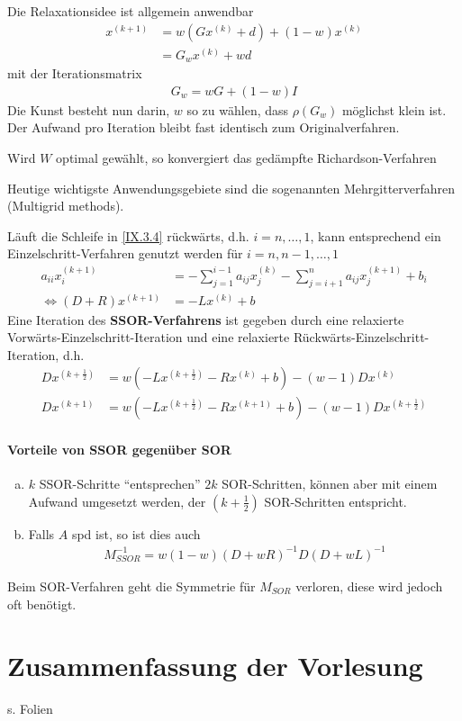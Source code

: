 Die Relaxationsidee ist allgemein anwendbar
\begin{align}\nonumber
  x^{(k+1)}&= w(Gx^{(k)}+d)+(1-w)x^{(k)}\\
           &=G_wx^{(k)}+wd
             \label{IX.4.4}
\end{align}
mit der Iterationsmatrix
\begin{gather}
  G_w = wG+(1-w)I
\label{IX.4.5}
\end{gather}
Die Kunst besteht nun darin, $w$ so zu wählen,
dass $\rho(G_w)$ möglichst klein ist.
Der Aufwand pro Iteration bleibt fast identisch
zum Originalverfahren.

Wird $W$ optimal gewählt, so konvergiert das gedämpfte
Richardson-Verfahren

Heutige wichtigste Anwendungsgebiete sind die sogenannten
Mehrgitterverfahren (Multigrid methods).

Läuft die Schleife in \eqref{IX.3.4} rückwärts,
d.h. $i=n,\ldots,1$, kann entsprechend ein Einzelschritt-Verfahren
 genutzt werden für $i=n,n-1,\ldots,1$
 \begin{align*}
   a_{ii}x_i^{(k+1)} &= -\sum_{j=1}^{i-1}a_{ij}x_j^{(k)}
   -\sum_{j=i+1}^{n}a_{ij}x_j^{(k+1)}
   +b_i \\
   \Leftrightarrow (D+R)x^{(k+1)} &= -Lx^{(k)}+b
 \end{align*}
Eine Iteration des \textbf{SSOR-Verfahrens} ist gegeben durch
eine relaxierte Vorwärts-Einzelschritt-Iteration und eine
relaxierte Rückwärts-Einzelschritt-Iteration, d.h.
\begin{align}
  Dx^{(k+\frac{1}{2})} &= w(-Lx^{(k+\frac{1}{2})}-Rx^{(k)}+b)
                         -(w-1)Dx^{(k)}\\\nonumber
  Dx^{(k+1)}&=w(-Lx^{(k+\frac{1}{2})}-Rx^{(k+1)}+b)
                         -(w-1)Dx^{(k+\frac{1}{2})}
\end{align}


\paragraph{Vorteile von SSOR gegenüber SOR}
\begin{enumerate}[a)]
\item $k$ SSOR-Schritte \enquote{entsprechen} $2k$ SOR-Schritten,
  können aber mit einem Aufwand umgesetzt werden, 
der $(k+\frac{1}{2})$ SOR-Schritten entspricht.
\item Falls $A$ spd ist, so ist dies auch
  \begin{gather}
    M_{SSOR}^{-1} = w(1-w)(D+wR)^{-1}D(D+wL)^{-1}
    \label{IX.4.7}
  \end{gather}
\end{enumerate}
Beim SOR-Verfahren geht die Symmetrie für $M_{SOR}$ verloren,
diese wird jedoch oft benötigt.

\section*{Zusammenfassung der Vorlesung}
s. Folien

